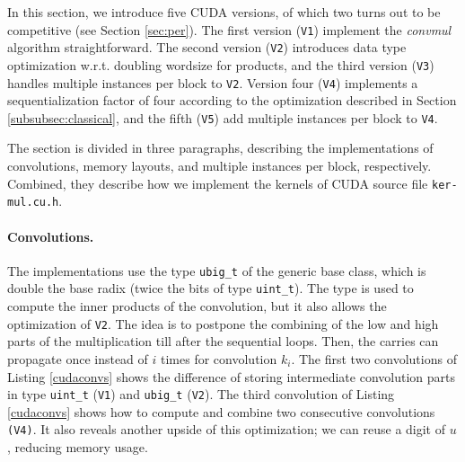 In this section, we introduce five CUDA versions, of which two turns out to be
competitive (see Section \ref{sec:per}). The first version (\texttt{V1})
implement the \textit{convmul} algorithm straightforward. The second version
(\texttt{V2}) introduces data type optimization w.r.t. doubling wordsize for
products, and the third version (\texttt{V3}) handles multiple instances per
block to \texttt{V2}. Version four (\texttt{V4}) implements a sequentialization
factor of four according to the optimization described in Section
\ref{subsubsec:classical}, and the fifth (\texttt{V5}) add multiple instances
per block to \texttt{V4}.

The section is divided in three paragraphs, describing the implementations of
convolutions, memory layouts, and multiple instances per block,
respectively. Combined, they describe how we implement the kernels of CUDA
source file \texttt{ker-mul.cu.h}.

\paragraph{Convolutions.}
The implementations use the type \texttt{ubig\_t} of the generic base class,
which is double the base radix (twice the bits of type \texttt{uint\_t}). The
type is used to compute the inner products of the convolution, but it also
allows the optimization of \texttt{V2}. The idea is to postpone the combining of
the low and high parts of the multiplication till after the sequential
loops. Then, the carries can propagate once instead of $i$ times for convolution
$k_i$. The first two convolutions of Listing \ref{cudaconvs} shows the
difference of storing intermediate convolution parts in type \texttt{uint\_t}
(\texttt{V1}) and \texttt{ubig\_t} (\texttt{V2}). The third convolution of
Listing \ref{cudaconvs} shows how to compute and combine two consecutive
convolutions \texttt{(V4)}. It also reveals another upside of this optimization;
we can reuse a digit of $u$, reducing memory usage.

